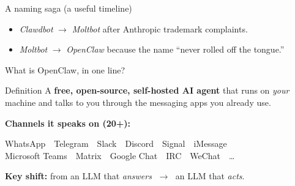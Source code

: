 \documentclass[aspectratio=169,11pt]{beamer}
\begin{document}
\begin{frame}{A naming saga (a useful timeline)}
  \centering
  \vspace{1.5em}
  \begin{itemize}
    \item \emph{Clawdbot} $\to$ \emph{Moltbot} after Anthropic trademark complaints.
    \item \emph{Moltbot} $\to$ \emph{OpenClaw} because the name ``never rolled off the tongue.''
  \end{itemize}
\end{frame}

\begin{frame}{What is OpenClaw, in one line?}
  \begin{block}{Definition}
    A \textbf{free, open-source, self-hosted AI agent} that runs on \emph{your}
    machine and talks to you through the messaging apps you already use.
  \end{block}
  \vspace{0.5em}
  \textbf{Channels it speaks on (20+):}
  \begin{center}
    WhatsApp \,\textbullet\, Telegram \,\textbullet\, Slack \,\textbullet\, Discord \,\textbullet\, Signal \,\textbullet\,
    iMessage \\ Microsoft Teams \,\textbullet\, Matrix \,\textbullet\, Google Chat \,\textbullet\, IRC \,\textbullet\, WeChat \,\textbullet\, \ldots
  \end{center}
  \vspace{0.5em}
  \begin{center}
    \textcolor{clawOrange}{\textbf{Key shift:}} from an LLM that \emph{answers} $\;\to\;$ an LLM that \emph{acts}.
  \end{center}
\end{frame}

\end{document}
